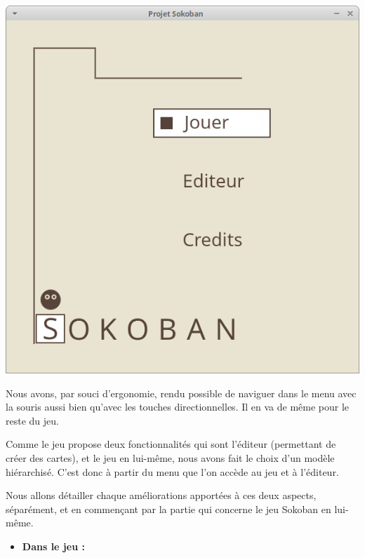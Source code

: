 \documentclass[english,11pt]{report}
\begin{document}
\begin{center} 
\includegraphics[scale=0.4]{menu}
\end{center}
\par
Nous avons, par souci d’ergonomie, rendu possible de naviguer dans le menu avec la souris aussi bien qu’avec les touches directionnelles. Il en va de même pour le reste du jeu.\par
\vspace{0,2cm}
Comme le jeu propose deux fonctionnalités qui sont l’éditeur (permettant de créer des cartes), et le jeu en lui-même, nous avons fait le choix d’un modèle hiérarchisé. C’est donc à partir du menu que l’on accède au jeu et à l’éditeur.\par
\vspace{0,2cm}
Nous allons détailler chaque améliorations apportées à ces deux aspects, séparément, et en commençant par la partie qui concerne le jeu Sokoban en lui-même.\par
\clearpage
\vspace{0.5cm}
\begin{itemize}[label=]
    \item{\textbf{Dans le jeu :}}
\end{itemize}
\vspace{0.5cm}
\end{document}
